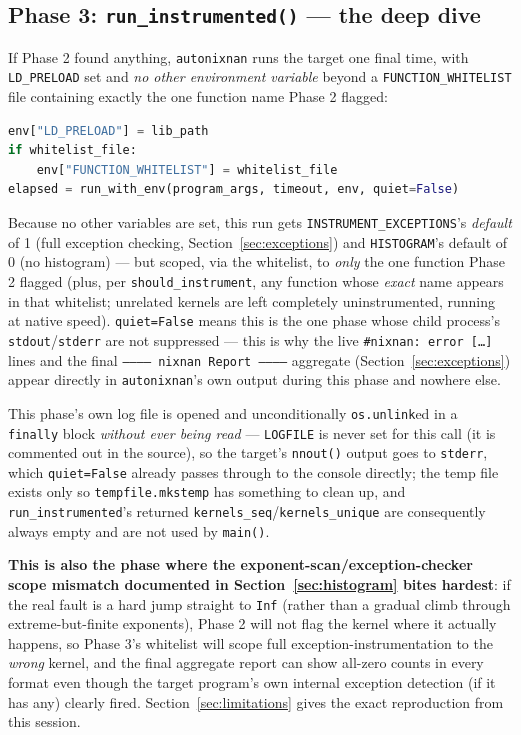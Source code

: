 \documentclass[11pt]{article}
\begin{document}
\subsection{Phase 3: \texttt{run\_instrumented()} --- the deep dive}

If Phase 2 found anything, \texttt{autonixnan} runs the target one final
time, with \texttt{LD\_PRELOAD} set and \emph{no other environment
variable} beyond a \texttt{FUNCTION\_WHITELIST} file containing exactly
the one function name Phase 2 flagged:

\begin{lstlisting}[language=Python]
env["LD_PRELOAD"] = lib_path
if whitelist_file:
    env["FUNCTION_WHITELIST"] = whitelist_file
elapsed = run_with_env(program_args, timeout, env, quiet=False)
\end{lstlisting}

Because no other variables are set, this run gets \texttt{INSTRUMENT\_EXCEPTIONS}'s
\emph{default} of 1 (full exception checking, Section~\ref{sec:exceptions})
and \texttt{HISTOGRAM}'s default of 0 (no histogram) --- but scoped, via
the whitelist, to \emph{only} the one function Phase 2 flagged (plus, per
\texttt{should\_instrument}, any function whose \emph{exact} name appears
in that whitelist; unrelated kernels are left completely uninstrumented,
running at native speed). \texttt{quiet=False} means this is the one
phase whose child process's \texttt{stdout}/\texttt{stderr} are not
suppressed --- this is why the live \texttt{\#nixnan: error [\ldots]}
lines and the final \texttt{------------ nixnan Report -----------}
aggregate (Section~\ref{sec:exceptions}) appear directly in
\texttt{autonixnan}'s own output during this phase and nowhere else.

This phase's own log file is opened and unconditionally
\texttt{os.unlink}ed in a \texttt{finally} block \emph{without ever being
read} --- \texttt{LOGFILE} is never set for this call (it is commented out
in the source), so the target's \texttt{nnout()} output goes to
\texttt{stderr}, which \texttt{quiet=False} already passes through to the
console directly; the temp file exists only so \texttt{tempfile.mkstemp}
has something to clean up, and \texttt{run\_instrumented}'s returned
\texttt{kernels\_seq}/\texttt{kernels\_unique} are consequently always
empty and are not used by \texttt{main()}.

\textbf{This is also the phase where the exponent-scan/exception-checker
scope mismatch documented in Section~\ref{sec:histogram} bites hardest}:
if the real fault is a hard jump straight to \texttt{Inf} (rather than a
gradual climb through extreme-but-finite exponents), Phase 2 will not
flag the kernel where it actually happens, so Phase 3's whitelist will
scope full exception-instrumentation to the \emph{wrong} kernel, and the
final aggregate report can show all-zero counts in every format even
though the target program's own internal exception detection (if it has
any) clearly fired. Section~\ref{sec:limitations} gives the exact
reproduction from this session.
\end{document}
